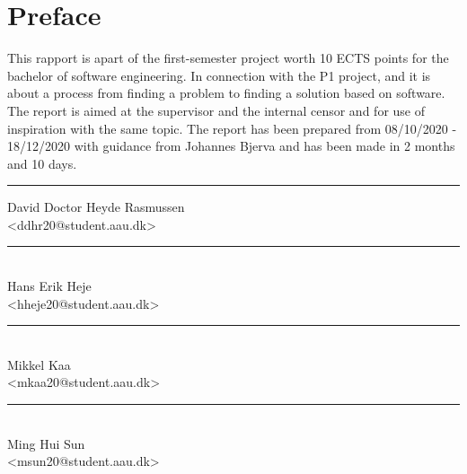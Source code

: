 \section*{Preface}%

This rapport is apart of the first-semester project worth 10 ECTS points for the bachelor of software engineering. 
In connection with the P1 project, and it is about a process from finding a problem to finding a solution based on software. 
The report is aimed at the supervisor and the internal censor and for use of inspiration with the same topic. 
The report has been prepared from 08/10/2020 - 18/12/2020 with guidance from Johannes Bjerva and
has been made in 2 months and 10 days.

\vfill\noindent

\begin{center}
  \begin{minipage}[b]{0.45\textwidth}
    \centering
    \rule{\textwidth}{0.5pt}
     David Doctor Heyde Rasmussen\\
    {\footnotesize <ddhr20@student.aau.dk>}
   \end{minipage}
\hfill
\begin{minipage}[b]{0.45\textwidth}
  \centering
  \rule{\textwidth}{0.5pt}\\
   Hans Erik Heje\\
  {\footnotesize <hheje20@student.aau.dk>}
 \end{minipage}
\vspace{3\baselineskip}
\end{center}

\begin{center}
\begin{minipage}[b]{0.45\textwidth}
 \centering
 \rule{\textwidth}{0.5pt}\\
  Mikkel Kaa\\
 {\footnotesize <mkaa20@student.aau.dk>}
\end{minipage}
\hfill
\begin{minipage}[b]{0.45\textwidth}
 \centering
 \rule{\textwidth}{0.5pt}\\
  Ming Hui Sun\\
 {\footnotesize <msun20@student.aau.dk>}
\end{minipage}
\end{center}